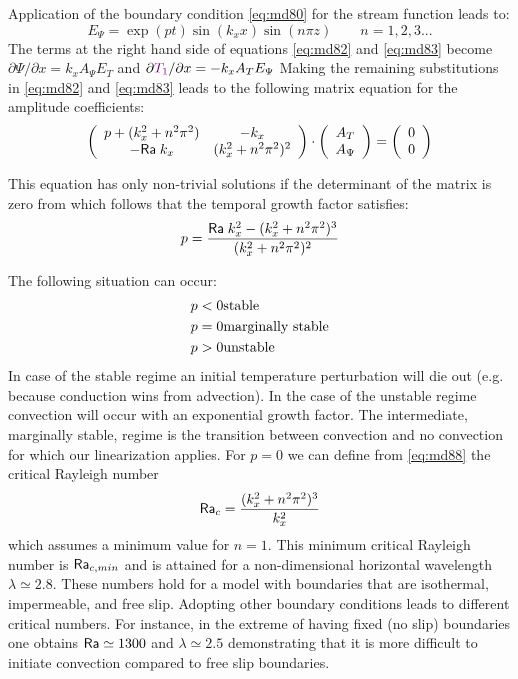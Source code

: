 Application of the boundary condition \eqref{eq:md80} for the stream function leads to:
\begin{equation}
E_\Psi = \exp (pt) \sin (k_x x) \sin (n\pi z) \qquad n=1,2,3...
\label{eq:md86}
\end{equation}
The terms at the right hand side of equations \eqref{eq:md82} and \eqref{eq:md83} become
$\partial \Psi/\partial x = k_x A_\Psi E_T$ and 
$\partial {\color{violet}T_1}/\partial x = -k_x A_T E_\Psi$
Making the remaining substitutions in \eqref{eq:md82} and \eqref{eq:md83} leads to the
following matrix equation for the amplitude coefficients:
\begin{equation}
\left(
\begin{array}{cc}
p + (k_x^2+ n^2 \pi^2) & -k_x \\
-{\mathsf{Ra}} \; k_x & (k_x^2 + n^2 \pi^2)^2
\end{array}
\right)
\cdot
\left(
\begin{array}{cc}
A_T \\ A_\Psi
\end{array}
\right)
=
\left(
\begin{array}{cc}
 0 \\ 0
\end{array}
\right)
\label{eq:md87}
\end{equation}

This equation has only non-trivial solutions if the determinant of the matrix is zero from
which follows that the temporal growth factor satisfies:
\begin{equation}
p = \frac{{\mathsf{Ra}}\;  k_x^2 - (k_x^2+n^2 \pi^2)^3}{(k_x^2+n^2\pi^2)^2}
\label{eq:md88}
\end{equation}

The following situation can occur:
\begin{eqnarray}
p<0 & \text{stable} \nonumber\\
p=0 & \text{marginally stable} \nonumber\\
p>0 & \text{unstable}  \nonumber
\end{eqnarray}
In case of the stable regime an initial temperature perturbation will die out (e.g. because
conduction wins from advection). In the case of the unstable regime convection will
occur with an exponential growth factor. The intermediate, marginally stable, regime is
the transition between convection and no convection for which our linearization applies.
For $p=0$ we can define from \eqref{eq:md88} the critical Rayleigh number
\begin{equation}
{\mathsf{Ra}}_c = \frac{(k_x^2+n^2\pi^2)^3}{k_x^2}
\end{equation}
which assumes a minimum value for $n=1$. This minimum
critical Rayleigh number is ${\mathsf{Ra}}_{c,min}$ and is attained for a non-dimensional horizontal
wavelength $\lambda \simeq 2.8$. These numbers hold for a model with boundaries that are
isothermal, impermeable, and free slip. Adopting other boundary conditions leads to
different critical numbers. For instance, in the extreme of having fixed (no slip) boundaries one
obtains ${\mathsf{Ra}} \simeq 1300$ and $\lambda \simeq 2.5$ demonstrating that it is more difficult to initiate
convection compared to free slip boundaries.

